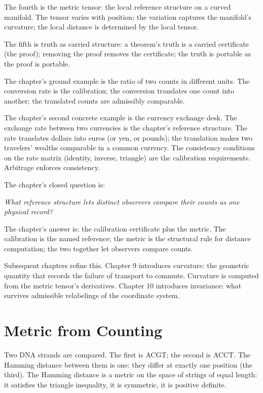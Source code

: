 \begin{chapteressay}
The fourth is the metric tensor: the local reference structure on
a curved manifold. The tensor varies with position; the
variation captures the manifold's curvature; the local distance
is determined by the local tensor.

The fifth is truth as carried structure: a theorem's truth is a
carried certificate (the proof); removing the proof removes the
certificate; the truth is portable as the proof is portable.

The chapter's ground example is the ratio of two counts in
different units. The conversion rate is the calibration; the
conversion translates one count into another; the translated
counts are admissibly comparable.

The chapter's second concrete example is the currency exchange
desk. The exchange rate between two currencies is the chapter's
reference structure. The rate translates dollars into euros (or
yen, or pounds); the translation makes two travelers' wealths
comparable in a common currency. The consistency conditions on the
rate matrix (identity, inverse, triangle) are the calibration
requirements. Arbitrage enforces consistency.

The chapter's closed question is:

\begin{center}
\emph{What reference structure lets distinct observers compare
their counts as one physical record?}
\end{center}

The chapter's answer is: the calibration certificate plus the
metric. The calibration is the named reference; the metric is
the structural rule for distance computation; the two together
let observers compare counts.

Subsequent chapters refine this. Chapter 9 introduces curvature:
the geometric quantity that records the failure of transport to
commute. Curvature is computed from the metric tensor's
derivatives. Chapter 10 introduces invariance: what survives
admissible relabelings of the coordinate system.

\end{chapteressay}

\section{Metric from Counting}
\label{se:metric-from-counting}

Two DNA strands are compared. The first is ACGT; the second is ACCT.
The Hamming distance between them is one: they differ at exactly one
position (the third). The Hamming distance is a metric on the space
of strings of equal length: it satisfies the triangle inequality, it
is symmetric, it is positive definite.

